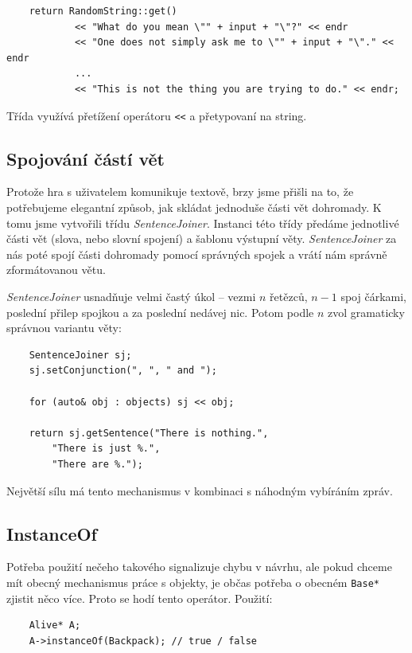 \documentclass[11pt, a4paper]{article}
\def\class#1{\emph{#1}}
\begin{document}
\begin{lstlisting}
	return RandomString::get()
		    << "What do you mean \"" + input + "\"?" << endr
		    << "One does not simply ask me to \"" + input + "\"." << endr
		    ...
			<< "This is not the thing you are trying to do." << endr;
\end{lstlisting}

\noindent Třída využívá přetížení operátoru \texttt{<<} a přetypovaní na string.

\subsection{Spojování částí vět}

Protože hra s uživatelem komunikuje textově, brzy jsme přišli na to, že potřebujeme elegantní způsob, jak skládat jednoduše části vět dohromady. K tomu jsme vytvořili třídu \class{SentenceJoiner}. Instanci této třídy předáme jednotlivé části vět (slova, nebo slovní spojení) a šablonu výstupní věty. \class{SentenceJoiner} za nás poté spojí části dohromady pomocí správných spojek a vrátí nám správně zformátovanou větu.

\class{SentenceJoiner} usnadňuje velmi častý úkol -- vezmi $n$ řetězců, $n-1$ spoj čárkami, poslední přilep spojkou  a za poslední nedávej nic. Potom podle $n$ zvol gramaticky správnou variantu věty:
\begin{lstlisting}
	SentenceJoiner sj;
	sj.setConjunction(", ", " and ");
	
	for (auto& obj : objects) sj << obj;
	
	return sj.getSentence("There is nothing.", 
		"There is just %.", 
		"There are %.");
\end{lstlisting}


\noindent Největší sílu má tento mechanismus v kombinaci s náhodným vybíráním zpráv.

\subsection{InstanceOf}

Potřeba použití nečeho takového signalizuje chybu v návrhu, ale pokud chceme mít obecný mechanismus práce s objekty, je občas potřeba o obecném \texttt{Base*} zjistit něco více. Proto se hodí tento operátor. Použití:

\begin{lstlisting}
	Alive* A;
	A->instanceOf(Backpack); // true / false
\end{lstlisting}
\end{document}
